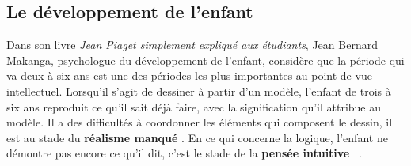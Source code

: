 \subsection{Le développement de l’enfant}
Dans son livre \emph{Jean Piaget simplement expliqué aux étudiants}, Jean Bernard Makanga, psychologue du développement de l’enfant, considère que la période qui va deux à six ans est une des périodes les plus importantes au point de vue intellectuel. Lorsqu’il s’agit de dessiner à partir d’un modèle, l’enfant de trois à six ans reproduit ce qu’il sait déjà faire, avec la signification qu’il attribue au modèle. Il a des difficultés à coordonner les éléments qui composent le dessin, il est au stade du \og \textbf{réalisme manqué} \fg{}. En ce qui concerne la logique, l’enfant ne démontre pas encore ce qu’il dit, c’est le stade de la \og \textbf{pensée intuitive} \fg{}~\cite{Makanga2015}.